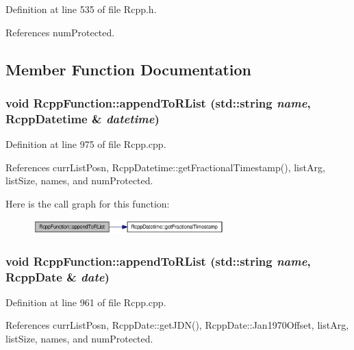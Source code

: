 Definition at line 535 of file Rcpp.h.

References numProtected.

\subsection{Member Function Documentation}
\hypertarget{classRcppFunction_0be4ab064287c2d3a5c3b883a1707d70}{
\subsubsection[{appendToRList}]{\setlength{\rightskip}{0pt plus 5cm}void RcppFunction::appendToRList (std::string {\em name}, \/  {\bf RcppDatetime} \& {\em datetime})}}
\label{classRcppFunction_0be4ab064287c2d3a5c3b883a1707d70}




Definition at line 975 of file Rcpp.cpp.

References currListPosn, RcppDatetime::getFractionalTimestamp(), listArg, listSize, names, and numProtected.

Here is the call graph for this function:\nopagebreak
\begin{figure}[H]
\begin{center}
\leavevmode
\includegraphics[width=209pt]{classRcppFunction_0be4ab064287c2d3a5c3b883a1707d70_cgraph}
\end{center}
\end{figure}
\hypertarget{classRcppFunction_9aab0b3accb81d90fb813acf3bf4c49d}{
\subsubsection[{appendToRList}]{\setlength{\rightskip}{0pt plus 5cm}void RcppFunction::appendToRList (std::string {\em name}, \/  {\bf RcppDate} \& {\em date})}}
\label{classRcppFunction_9aab0b3accb81d90fb813acf3bf4c49d}




Definition at line 961 of file Rcpp.cpp.

References currListPosn, RcppDate::getJDN(), RcppDate::Jan1970Offset, listArg, listSize, names, and numProtected.

